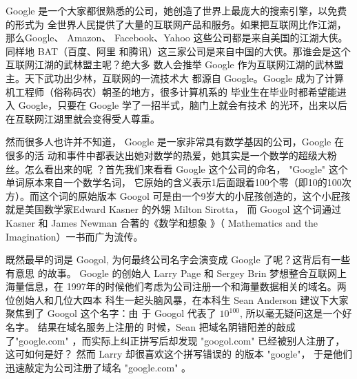 Google 是一个大家都很熟悉的公司，她创造了世界上最庞大的搜索引擎，以免费的形式为
全世界人民提供了大量的互联网产品和服务。如果把互联网比作江湖，那么Google、
Amazon、 Facebook、Yahoo 这些公司都是来自美国的江湖大侠。同样地 BAT（百度、阿里
和腾讯）这三家公司是来自中国的大侠。那谁会是这个互联网江湖的武林盟主呢？绝大多
数人会推举 Google 作为互联网江湖的武林盟主。天下武功出少林，互联网的一流技术大
都源自 Google。Google 成为了计算机工程师（俗称码农）朝圣的地方，很多计算机系的
毕业生在毕业时都希望能进入 Google，只要在 Google 学了一招半式，脑门上就会有技术
的光环，出来以后在互联网江湖里就会变得受人尊重。

然而很多人也许并不知道， Google 是一家非常具有数学基因的公司，Google 在很多的活
动和事件中都表达出她对数学的热爱，她其实是一个数学的超级大粉丝。怎么看出来的呢
？首先我们来看看 Google 这个公司的命名， "Google" 这个单词原本来自一个数学名词，
它原始的含义表示1后面跟着100个零（即10的100次方）。而这个词的原始版本 Googol
可是由一个9岁大的小屁孩创造的，这个小屁孩就是美国数学家Edward Kasner 的外甥
Milton Sirotta， 而 Googol 这个词通过Kasner 和 James Newman 合著的《数学和想象
》（ Mathematics and the Imagination）一书而广为流传。

既然最早的词是 Googol, 为何最终公司名字会演变成 Google 了呢？这背后有一些有意思
的故事。 Google 的创始人 Larry Page 和 Sergey Brin 梦想整合互联网上海量信息，在
1997年的时候他们考虑为公司注册一个和海量数据相关的域名。两位创始人和几位大四本
科生一起头脑风暴，在本科生 Sean Anderson 建议下大家聚焦到了 Googol 这个名字：由
于 Googol 代表了 $10^100$, 所以毫无疑问这是一个好名字。 结果在域名服务上注册的
时候，Sean 把域名阴错阳差的敲成了"google.com" ，而实际上纠正拼写后却发现
"googol.com" 已经被别人注册了，这可如何是好？ 然而 Larry 却很喜欢这个拼写错误的
的版本 "google"， 于是他们迅速敲定为公司注册了域名 "google.com" 。 


